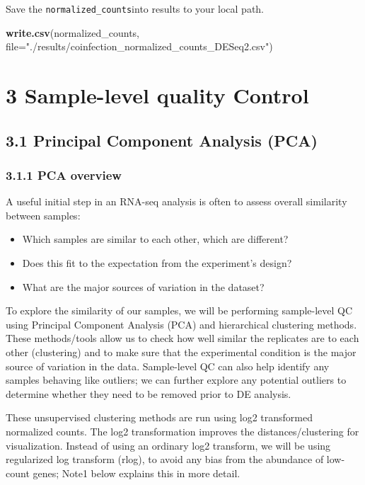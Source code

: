 \documentclass[
]{article}
\newenvironment{Shaded}{\begin{snugshade}}{\end{snugshade}}
\newcommand{\AttributeTok}[1]{\textcolor[rgb]{0.13,0.29,0.53}{#1}}
\newcommand{\FunctionTok}[1]{\textcolor[rgb]{0.13,0.29,0.53}{\textbf{#1}}}
\newcommand{\NormalTok}[1]{#1}
\newcommand{\StringTok}[1]{\textcolor[rgb]{0.31,0.60,0.02}{#1}}
\begin{document}
Save the \texttt{normalized\_counts}into results to your local path.

\begin{Shaded}
\begin{Highlighting}[]
\FunctionTok{write.csv}\NormalTok{(normalized\_counts, }\AttributeTok{file=}\StringTok{"./results/coinfection\_normalized\_counts\_DESeq2.csv"}\NormalTok{)}
\end{Highlighting}
\end{Shaded}

\section{3 Sample-level quality
Control}\label{sample-level-quality-control}

\subsection{3.1 Principal Component Analysis
(PCA)}\label{principal-component-analysis-pca}

\subsubsection{3.1.1 PCA overview}\label{pca-overview}

A useful initial step in an RNA-seq analysis is often to assess overall
similarity between samples:

\begin{itemize}
\item
  Which samples are similar to each other, which are different?
\item
  Does this fit to the expectation from the experiment's design?
\item
  What are the major sources of variation in the dataset?
\end{itemize}

To explore the similarity of our samples, we will be performing
sample-level QC using Principal Component Analysis (PCA) and
hierarchical clustering methods. These methods/tools allow us to check
how well similar the replicates are to each other (clustering) and to
make sure that the experimental condition is the major source of
variation in the data. Sample-level QC can also help identify any
samples behaving like outliers; we can further explore any potential
outliers to determine whether they need to be removed prior to DE
analysis.

These unsupervised clustering methods are run using log2 transformed
normalized counts. The log2 transformation improves the
distances/clustering for visualization. Instead of using an ordinary
log2 transform, we will be using regularized log transform (rlog), to
avoid any bias from the abundance of low-count genes; Note1 below
explains this in more detail.
\end{document}
